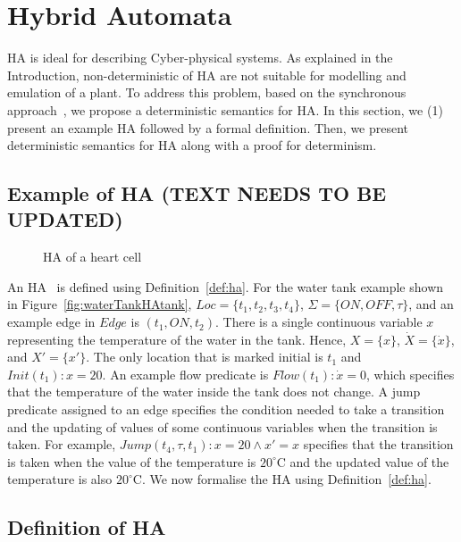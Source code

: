 \section{Hybrid Automata}
\label{sec:HA}



\acf{HA} is ideal for describing 
Cyber-physical systems. As explained in the Introduction,
non-deterministic of \ac{HA} are not suitable for modelling and
emulation of a plant. To address this problem, based on the
synchronous approach~\cite{benveniste03}, we propose a deterministic semantics for \ac{HA}.
In this section, we (1) present an example \ac{HA} 
followed by a formal definition.
Then, we present deterministic semantics for \ac{HA} 
along with a proof for determinism.



\subsection{Example of \ac{HA} (TEXT NEEDS TO BE UPDATED)}

\begin{figure}
\centering

\caption{\acf{HA} of a heart cell}
\end{figure}

An HA~\cite{lynch03} is defined using Definition~\ref{def:ha}. For the
water tank example shown in Figure~\ref{fig:waterTankHAtank},
$Loc=\{t_1, t_2, t_3, t_4\}$, $\Sigma=\{ON, OFF, \tau\}$, and an example
edge in $Edge$ is $(t_1, ON, t_2)$. There is a single continuous
variable $x$ representing the temperature of the water in the
tank. Hence, $X=\{x\}$, $\dot{X}=\{\dot{x}\}$, and $X'=\{x'\}$. The only
location that is marked initial is $t_1$ and $Init(t_1): x=20$. An
example flow predicate is $Flow(t_1): \dot{x}=0$, which specifies that
the temperature of the water inside the tank does not change.  A jump
predicate assigned to an edge specifies the condition needed to take a
transition and the updating of values of some continuous variables when
the transition is taken.  For example,
$Jump(t_4, \tau, t_1): x=20 \wedge x'=x$ specifies that the transition
is taken when the value of the temperature is $20^\circ$C and the
updated value of the temperature is also $20^\circ$C. We now formalise
the HA using Definition~\ref{def:ha}.

\subsection{Definition of \ac{HA}}

